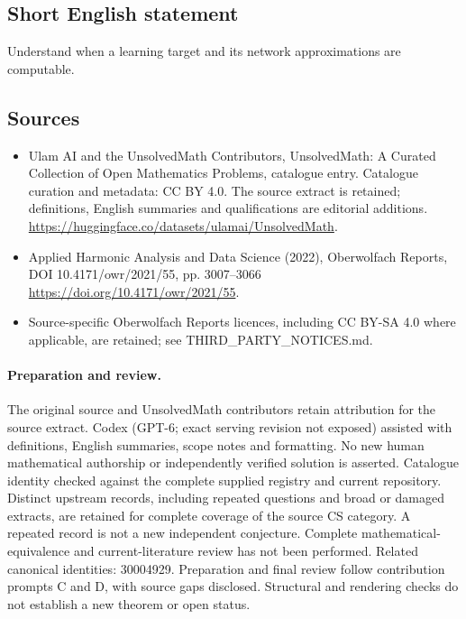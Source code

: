 \documentclass[11pt]{article}
\begin{document}
\subsection{Short English statement}
Understand when a learning target and its network approximations are computable.
\subsection{Sources}
\begin{itemize}
\item[\hypertarget{source:statement:1}{S1}] Ulam AI and the UnsolvedMath Contributors, UnsolvedMath: A Curated Collection of Open Mathematics Problems, catalogue entry. Catalogue curation and metadata: CC BY 4.0. The source extract is retained; definitions, English summaries and qualifications are editorial additions.
\url{https://huggingface.co/datasets/ulamai/UnsolvedMath}.
\item[\hypertarget{source:statement:2}{S2}] Applied Harmonic Analysis and Data Science (2022), Oberwolfach Reports, DOI 10.4171/owr/2021/55, pp. 3007--3066
\url{https://doi.org/10.4171/owr/2021/55}.
\item Source-specific Oberwolfach Reports licences, including CC BY-SA 4.0 where applicable, are retained; see THIRD\_PARTY\_NOTICES.md.
\end{itemize}
\paragraph{Preparation and review.}
The original source and UnsolvedMath contributors retain attribution for the source extract. Codex (GPT-6; exact serving revision not exposed) assisted with definitions, English summaries, scope notes and formatting. No new human mathematical authorship or independently verified solution is asserted. Catalogue identity checked against the complete supplied registry and current repository. Distinct upstream records, including repeated questions and broad or damaged extracts, are retained for complete coverage of the source CS category. A repeated record is not a new independent conjecture. Complete mathematical-equivalence and current-literature review has not been performed. Related canonical identities: 30004929. Preparation and final review follow contribution prompts C and D, with source gaps disclosed. Structural and rendering checks do not establish a new theorem or open status.
\label{end:statement}
\end{document}
